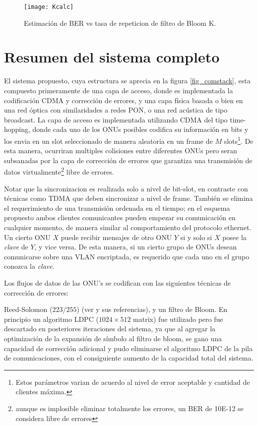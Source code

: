 \begin{figure}[!t]
  \centering
    \texttt{[image: Kcalc]}
    \caption{Estimación de BER vs tasa de repeticion de filtro de Bloom K.}
    \label{BERvsK}
\end{figure}


\section{Resumen del sistema completo}
El sistema propuesto, cuya estructura se aprecia en la figura \ref{fig_comstack}, esta compuesto primeramente de una capa de acceso, donde es implementada la codificación CDMA y corrección de errores, y una capa física basada o bien en una red óptica con similaridades a redes PON, o una red acústica de tipo broadcast.
La capa de acceso es implementada utilizando CDMA del tipo time-hopping, donde cada uno de los ONUs posibles codifica su información en bits y los envia en un slot seleccionado de manera aleatoria en un frame de $M$ slots\footnote{ Estos parámetros varian de acuerdo al nivel de error aceptable y cantidad de clientes máxima.}. De esta manera, ocurriran multiples colisiones entre diferentes ONUs pero seran subsanadas por la capa de corrección de errores que garantiza una transmisión de datos virtualmente\footnote{aunque es implosible eliminar totalmente los errores, un BER de 10E-12 se considera libre de errores} libre de errores.

Notar que la sincronizacion es realizada solo a nivel de bit-slot, en contraste con técnicas como TDMA que deben sincronizar a nivel de frame. También se elimina el requerimiento de una transmisión ordenada en el tiempo; en el esquema propuesto ambos clientes comunicantes pueden empezar su comunicación en cualquier momento, de manera similar al comportamiento del protocolo ethernet.
Un cierto ONU $X$ puede recibir mensajes de otro ONU $Y$ si y solo si $X$ posee la {\em clave} de $Y$, y vice versa. De esta manera, si un cierto grupo de ONUs desean comunicarse sobre una VLAN encriptada, es requerido que cada uno en el grupo conozca la {\em clave}.

Los flujos de datos de las ONU's se codifican con las siguientes técnicas de corrección de errores:

Reed-Solomon ($223/255$) (ver \cite{Moon:05} y sus referencias), y un filtro de Bloom\cite{Bloom70space/timetrade-offs}. En principio un algoritmo LDPC ($1024\times512$ matrix) fue utilizado pero fue descartado en posteriores iteraciones del sistema, ya que al agregar la optimización de la expansión de símbolo al filtro de bloom, se gano una capacidad de corrección adicional y pudo eliminarse el algoritmo LDPC de la pila de comunicaciones, con el consiguiente aumento de la capacidad total del sistema.

